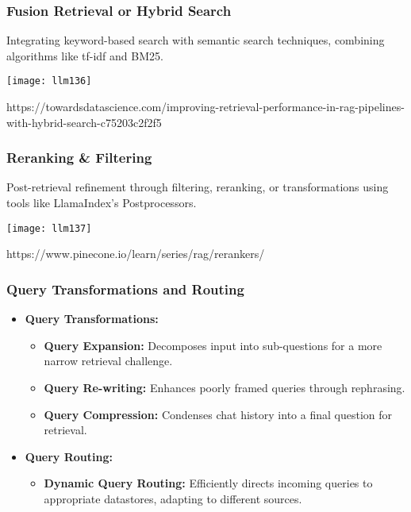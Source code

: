 \begin{frame}[fragile]\frametitle{Fusion Retrieval or Hybrid Search}
Integrating keyword-based search with semantic search techniques, combining algorithms like tf-idf and BM25.

\begin{center}
\texttt{[image: llm136]}
\end{center}			

 https://towardsdatascience.com/improving-retrieval-performance-in-rag-pipelines-with-hybrid-search-c75203c2f2f5
\end{frame}

\begin{frame}[fragile]\frametitle{Reranking \& Filtering}
Post-retrieval refinement through filtering, reranking, or transformations using tools like LlamaIndex's Postprocessors.

\begin{center}
\texttt{[image: llm137]}
\end{center}			

https://www.pinecone.io/learn/series/rag/rerankers/

\end{frame}

\begin{frame}[fragile]\frametitle{Query Transformations and Routing}

\begin{itemize}
\item \textbf{Query Transformations:}
  \begin{itemize}
	\item \textbf{Query Expansion:} Decomposes input into sub-questions for a more narrow retrieval challenge.
	\item \textbf{Query Re-writing:} Enhances poorly framed queries through rephrasing.
	\item \textbf{Query Compression:} Condenses chat history into a final question for retrieval.
  \end{itemize}
\item \textbf{Query Routing:}
  \begin{itemize}
	\item \textbf{Dynamic Query Routing:} Efficiently directs incoming queries to appropriate datastores, adapting to different sources.
  \end{itemize}
\end{itemize}

\end{frame}

